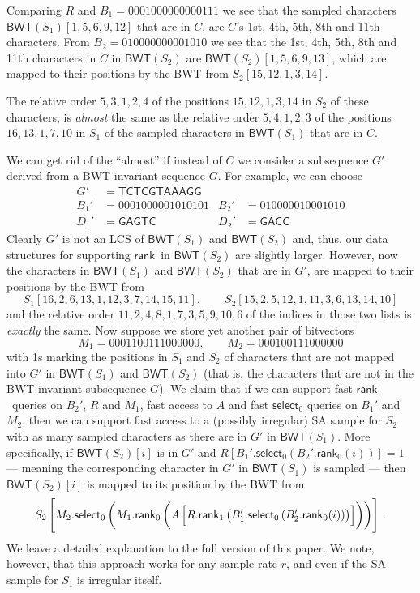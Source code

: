 \documentclass{llncs}
\newcommand{\BWT}
  {\ensuremath{\mathsf{BWT}}}
\newcommand{\rank}
  {\ensuremath{\mathsf{rank}}}
\newcommand{\select}
  {\ensuremath{\mathsf{select}}}
\begin{document}
Comparing $R$ and \(B_1 = 0001000000000111\) we see that the sampled
characters \(\BWT (S_1) [1, 5, 6, 9, 12]\) that are in $C$, are $C$'s 1st,
4th, 5th, 8th and 11th characters. From \(B_2 = 010000000001010\) we see that
the 1st, 4th, 5th, 8th and 11th characters in $C$ in \(\BWT (S_2)\) are
\(\BWT (S_2) [1, 5, 6, 9, 13]\), which are mapped to their positions by the
BWT from \(S_2 [15, 12, 1, 3, 14]\).

The relative order \(5, 3, 1, 2, 4\) of the positions \(15, 12, 1, 3, 14\) in
$S_2$ of these characters, is {\em almost} the same as the relative order
\(5, 4, 1, 2, 3\) of the positions \(16, 13, 1, 7, 10\) in $S_1$ of the
sampled characters in \(\BWT (S_1)\) that are in $C$.

We can get rid of the ``almost'' if instead of $C$ we consider a subsequence
$G'$ derived from a BWT-invariant sequence $G$. For example, we can choose
\begin{align*}
G' & = \mathsf{TCTCGTAAAGG}\\
B_1' & = 0001000001010101 & B_2' & = 010000010001010\\
D_1' & = \mathsf{GAGTC} & D_2' & = \mathsf{GACC}
\end{align*}
Clearly $G'$ is not an LCS of \(\BWT (S_1)\) and \(\BWT (S_2)\) and, thus,
our data structures for supporting \rank\ in \(\BWT (S_2)\) are slightly
larger. However, now the characters in \(\BWT (S_1)\) and \(\BWT (S_2)\) that
are in $G'$, are mapped to their positions by the BWT from
$$
S_1 [16, 2, 6, 13, 1, 12, 3, 7, 14, 15, 11],\qquad
S_2 [15, 2, 5, 12, 1, 11, 3, 6, 13, 14, 10]
$$
and the relative order \(11, 2, 4, 8, 1, 7, 3, 5, 9, 10, 6\) of the indices
in those two lists is {\em exactly} the same. Now suppose we store yet
another pair of bitvectors
$$
M_1 = 0001100111000000,\qquad
M_2 = 000100111000000
$$
with 1s marking the positions in $S_1$ and $S_2$ of characters that are not
mapped into $G'$ in \(\BWT (S_1)\) and \(\BWT (S_2)\) (that is, the
characters that are not in the BWT-invariant subsequence $G$). We claim that
if we can support fast \rank\ queries on $B_2'$, $R$ and $M_1$, fast access
to $A$ and fast $\select_0$ queries on $B_1'$ and $M_2$, then we can support
fast access to a (possibly irregular) SA sample for $S_2$ with as many
sampled characters as there are in $G'$ in \(\BWT (S_1)\).  More
specifically, if \(\BWT (S_2) [i]\) is in $G'$ and \(R [B_1'.\select_0
(B_2'.\rank_0 (i))] = 1\)
--- meaning the corresponding character in $G'$ in \(\BWT (S_1)\) is sampled --- then \(\BWT (S_2) [i]\) is mapped to its position by the BWT from
\[S_2 \left[ \rule{0ex}{4ex}
    M_2.\select_0 \left( \rule{0ex}{3.5ex}
      M_1.\rank_0 \left( \rule{0ex}{3ex}
        A \left[ \rule{0ex}{2.5ex}
          R.\rank_1 \left( \rule{0ex}{2ex}
            B_1'.\select_0 \left(
              B_2'.\rank_0 (i)
            \right)
          \right)
        \right]
      \right)
    \right)
  \right]\,.\]
We leave a detailed explanation to the full version of this paper.  We note,
however, that this approach works for any sample rate $r$, and even if the SA
sample for $S_1$ is irregular itself.
\end{document}
